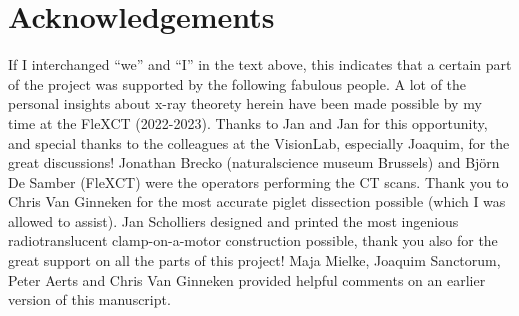 \section{Acknowledgements}
\label{sec:orgcd1acf0}
If I interchanged ``we'' and ``I'' in the text above, this indicates that a certain part of the project was supported by the following fabulous people.
A lot of the personal insights about x-ray theorety herein have been made possible by my time at the FleXCT (2022-2023). Thanks to Jan and Jan for this opportunity, and special thanks to the colleagues at the VisionLab, especially Joaquim, for the great discussions!
Jonathan Brecko (naturalscience museum Brussels) and Björn De Samber (FleXCT) were the operators performing the CT scans.
Thank you to Chris Van Ginneken for the most accurate piglet dissection possible (which I was allowed to assist).
Jan Scholliers designed and printed the most ingenious radiotranslucent clamp-on-a-motor construction possible, thank you also for the great support on all the parts of this project!
Maja Mielke, Joaquim Sanctorum, Peter Aerts and Chris Van Ginneken provided helpful comments on an earlier version of this manuscript.

